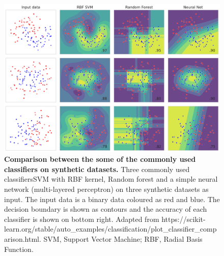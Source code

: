 \begin{figure}[!hbtp]
\centerline{\includegraphics[width=1\textwidth]{chapters/Introduction/Figures/classifier_comparision.pdf}}
\caption[Comparison between some of the commonly used classifiers on synthetic datasets..]{{\bf Comparison between the some of the commonly used classifiers on synthetic datasets.} Three commonly used classifiers\textemdash SVM with RBF kernel, Random forest and a simple neural network (multi-layered perceptron) on three synthetic datasets as input. The input data is a binary data coloured as red and blue. The decision boundary is shown as contours and the accuracy of each classifier is shown on bottom right. Adapted from https://scikit-learn.org/stable/auto\_examples/classification/plot\_classifier\_comparison.html. SVM, Support Vector Machine; RBF, Radial Basis Function.}\label{fig:classifier_comparision}
\end{figure}